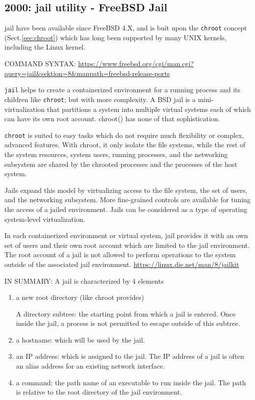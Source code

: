 \subsection{2000: jail utility - FreeBSD Jail}
\label{sec:jail}

jail have been available since FreeBSD 4.X, and is buit upon the \verb!chroot!
concept (Sect.\ref{sec:chroot}) which has long been supported by many UNIX
kernels, including the Linux kernel.

COMMAND SYNTAX:
\url{https://www.freebsd.org/cgi/man.cgi?query=jail&sektion=8&manpath=freebsd-release-ports}

\verb!jail! helps to create a containerized environment for a running process
and its children like \verb!chroot!; but with more complexity.
A BSD jail is a mini-virtualization that partitions a system into multiple
virtual systems each of which can have its own root account. chroot() has none
of that sophistication.

\verb!chroot! is suited to easy tasks which do not require much flexibility or
complex, advanced features. With chroot, it only isolate the file systems, while
the rest of the system resources, system users, running processes, and the
networking subsystem are shared by the chrooted processes and the processes of
the host system.

Jails expand this model by virtualizing access to the file system, the set of
users, and the networking subsystem. More fine-grained controls are available
for tuning the access of a jailed environment. Jails can be considered as a type
of operating system-level virtualization.

In each containerized environment or virtual system, jail provides it with an
own set of users and their own root account which are limited to the jail
environment. The root account of a jail is not allowed to perform operations to
the system outside of the associated jail environment.
\url{https://linux.die.net/man/8/jailkit}

IN SUMMARY: A jail is characterized by 4 elements
\begin{enumerate}
  \item a new root directory (like chroot provides)
  
  A directory subtree: the starting point from which a jail is entered. Once
  inside the jail, a process is not permitted to escape outside of this subtree.
  
  \item a hostname: which will be used by the jail.
  
  \item an IP address: which is assigned to the jail. The IP address of a jail
  is often an alias address for an existing network interface.

  \item a  command: the path name of an executable to run inside the jail. The
  path is relative to the root directory of the jail environment.
  
\end{enumerate}

